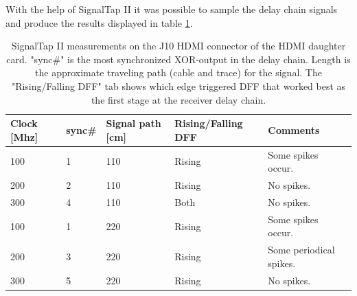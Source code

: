 \documentclass[main.tex]{subfiles}
\begin{document}
With the help of SignalTap II it was possible to sample the delay chain signals and produce the results displayed in table \ref{tab:delch}. 
\begin{table}
\centering
\caption{SignalTap II measurements on the J10 HDMI connector of the HDMI daughter card. "sync\#" is the most synchronized XOR-output in the delay chain. Length is the approximate traveling path (cable and trace) for the signal. The "Rising/Falling DFF" tab shows which edge triggered DFF that worked best as the first stage at the receiver delay chain.}
\label{tab:delch}
\begin{tabular}{|p{1cm}|p{1.5cm}|p{2cm}|p{2.5cm}|p{5cm}|}
\hline
 Clock [Mhz]  & sync\#   & Signal path [cm]   & Rising/Falling DFF  & Comments \\ \hline
 100          & 1     & 110           & Rising              & Some spikes occur.  \\ \hline
 200          & 2     & 110           & Rising              & No spikes. \\ \hline
 300          & 4     & 110           & Both                & No spikes. \\ \hline
 100          & 1     & 220           & Rising              & Some spikes occur.\\ \hline
 200          & 3     & 220           & Rising              & Some periodical spikes.\\ \hline
 300          & 5     & 220           & Rising              & No spikes.\\ \hline
\end{tabular}
\end{table}


\end{document}
